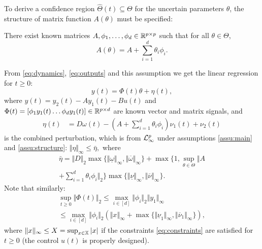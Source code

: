 \documentclass[letterpaper, 10 pt, conference]{ieeeconf}  %
\begin{document}
To derive a confidence region $\hat{\Theta}(t)\subseteq\Theta$ for
the uncertain parameters $\theta$, the structure of matrix function
$A(\theta)$ must be specified:
\begin{assumption}
\label{assu:structure} There exist known matrices $A,\phi_{1},\dots,\phi_{d}\in\mathbb{R}^{p\times p}$
such that for all $\theta\in\Theta$,
\[
A(\theta)=A+\sum_{i=1}^{d}\theta_{i}\phi_{i}.
\]

\end{assumption}
From \eqref{eq:dynamics}, \eqref{eq:outputs} and this assumption
we get the linear regression for $t\geq0$:
\begin{equation}
y(t)=\Phi(t)\theta+\eta(t),\label{eq:lin_regr}
\end{equation}
where $y(t)=y_{2}(t)-Ay_{1}(t)-Bu(t)$ and $\Phi(t)=[\phi_{1}y_{1}(t)\dots\phi_{d}y_{1}(t)]\in\mathbb{R}^{p\times d}$
are known vector and matrix signals, and
\begin{align*}
\eta(t) & =D\omega(t)-\left(A+\sum_{i=1}^{d}\theta_{i}\phi_{i}\right)\nu_{1}(t)+\nu_{2}(t)
\end{align*}
is the combined perturbation, which is from $\mathcal{L}_{\infty}^{p}$ under
assumptions \ref{assu:main} and \ref{assu:structure}:
$
\Vert\eta\Vert_{\infty}\leq\bar{\eta},
$
where
\begin{gather*}
\bar{\eta}=\Vert D\Vert_{2}\max\{\Vert\underline{\omega}\Vert_{\infty},\Vert\overline{\omega}\Vert_{\infty}\}+\max\{1,\sup_{\theta\in\Theta}\Vert A\\
+\sum_{i=1}^{d}\theta_{i}\phi_{i}\Vert_{2}\}\max\{\Vert\underline{\nu}\Vert_{\infty},\Vert\overline{\nu}\Vert_{\infty}\}.
\end{gather*}
Note that similarly:
\begin{gather*}
\sup_{t\geq0}\Vert\Phi(t)\Vert_{2}\leq\max_{i\in[d]}\Vert\phi_{i}\Vert_{2}\Vert y_{1}\Vert_{\infty}\\
\leq\max_{i\in[d]}\Vert\phi_{i}\Vert_{2}(\Vert x\Vert_{\infty}+\max\{\Vert\underline{\nu}_{1}\Vert_{\infty},\Vert\overline{\nu}_{1}\Vert_{\infty}\}),
\end{gather*}
where $\Vert x\Vert_{\infty}\leq X=\sup_{x\in\mathbb{X}}|x|$ if the constraints
\eqref{eq:constraints} are satisfied for $t\geq0$ (the control $u(t)$
is properly designed). 
\end{document}
